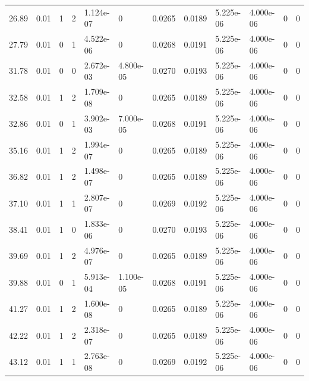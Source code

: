 \documentclass[preview]{standalone}
\begin{document}
{{\begin{tabular}{L{1.2cm}C{1.2cm} C{0.3cm}C{0.5cm} C{1.4cm}C{1.4cm} C{1.4cm}C{1.4cm} C{1.6cm}C{1.6cm} C{1.6cm}C{1.6cm}}
  26.89  &  0.01  & 1     &  2 &  1.124e-07  & 0  &  0.0265&   0.0189& 5.225e-06 & 4.000e-06   &  0 & 0  \\ 
  27.79  &  0.01  & 0     &  1 &  4.522e-06  & 0  &  0.0268&   0.0191& 5.225e-06 & 4.000e-06   &  0 & 0  \\ 
  31.78  &  0.01  & 0     &  0 &  2.672e-03  & 4.800e-05  &  0.0270&   0.0193& 5.225e-06 & 4.000e-06   &  0 & 0  \\ 
  32.58  &  0.01  & 1     &  2 &  1.709e-08  & 0  &  0.0265&   0.0189& 5.225e-06 & 4.000e-06   &  0 & 0  \\ 
  32.86  &  0.01  & 0     &  1 &  3.902e-03  & 7.000e-05  &  0.0268&   0.0191& 5.225e-06 & 4.000e-06   &  0 & 0  \\ 
  35.16  &  0.01  & 1     &  2 &  1.994e-07  & 0  &  0.0265&   0.0189& 5.225e-06 & 4.000e-06   &  0 & 0  \\ 
  36.82  &  0.01  & 1     &  2 &  1.498e-07  & 0  &  0.0265&   0.0189& 5.225e-06 & 4.000e-06   &  0 & 0  \\ 
  37.10  &  0.01  & 1     &  1 &  2.807e-07  & 0  &  0.0269&   0.0192& 5.225e-06 & 4.000e-06   &  0 & 0  \\ 
  38.41  &  0.01  & 1     &  0 &  1.833e-06  & 0  &  0.0270&   0.0193& 5.225e-06 & 4.000e-06   &  0 & 0  \\ 
  39.69  &  0.01  & 1     &  2 &  4.976e-07  & 0  &  0.0265&   0.0189& 5.225e-06 & 4.000e-06   &  0 & 0  \\ 
  39.88  &  0.01  & 0     &  1 &  5.913e-04  & 1.100e-05  &  0.0268&   0.0191& 5.225e-06 & 4.000e-06   &  0 & 0  \\ 
  41.27  &  0.01  & 1     &  2 &  1.600e-08  & 0  &  0.0265&   0.0189& 5.225e-06 & 4.000e-06   &  0 & 0  \\ 
  42.22  &  0.01  & 1     &  2 &  2.318e-07  & 0  &  0.0265&   0.0189& 5.225e-06 & 4.000e-06   &  0 & 0  \\ 
  43.12  &  0.01  & 1     &  1 &  2.763e-08  & 0  &  0.0269&   0.0192& 5.225e-06 & 4.000e-06   &  0 & 0  \\ 
\hline 
\end{tabular} 

}}
\end{document}
